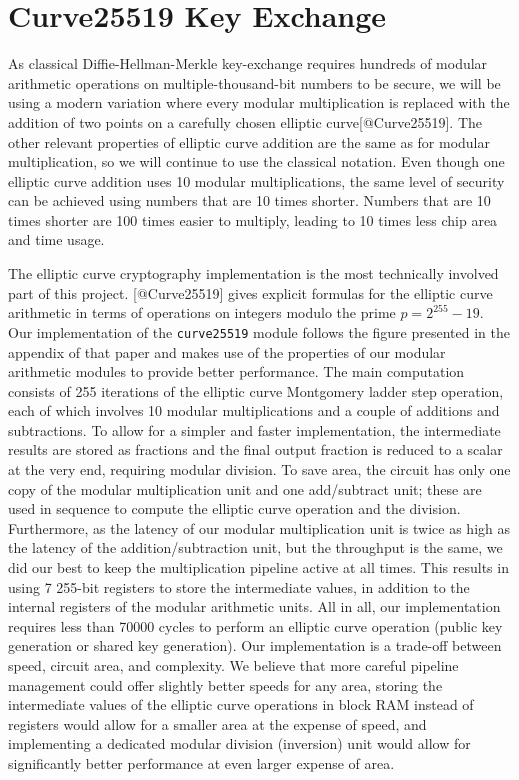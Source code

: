 \section{Curve25519 Key Exchange}\label{curve25519-key-exchange}

As classical Diffie-Hellman-Merkle key-exchange requires hundreds of
modular arithmetic operations on multiple-thousand-bit numbers to be
secure, we will be using a modern variation where every modular
multiplication is replaced with the addition of two points on a
carefully chosen elliptic curve{[}@Curve25519{]}. The other relevant
properties of elliptic curve addition are the same as for modular
multiplication, so we will continue to use the classical notation. Even
though one elliptic curve addition uses 10 modular multiplications, the
same level of security can be achieved using numbers that are 10 times
shorter. Numbers that are 10 times shorter are 100 times easier to
multiply, leading to 10 times less chip area and time usage.

The elliptic curve cryptography implementation is the most technically
involved part of this project. {[}@Curve25519{]} gives explicit formulas
for the elliptic curve arithmetic in terms of operations on integers
modulo the prime \(p=2^{255} -19\). Our implementation of the
\texttt{curve25519} module follows the figure presented in the appendix
of that paper and makes use of the properties of our modular arithmetic
modules to provide better performance. The main computation consists of
255 iterations of the elliptic curve Montgomery ladder step operation,
each of which involves 10 modular multiplications and a couple of
additions and subtractions. To allow for a simpler and faster
implementation, the intermediate results are stored as fractions and the
final output fraction is reduced to a scalar at the very end, requiring
modular division. To save area, the circuit has only one copy of the
modular multiplication unit and one add/subtract unit; these are used in
sequence to compute the elliptic curve operation and the division.
Furthermore, as the latency of our modular multiplication unit is twice
as high as the latency of the addition/subtraction unit, but the
throughput is the same, we did our best to keep the multiplication
pipeline active at all times. This results in using 7 255-bit registers
to store the intermediate values, in addition to the internal registers
of the modular arithmetic units. All in all, our implementation requires
less than 70000 cycles to perform an elliptic curve operation (public
key generation or shared key generation). Our implementation is a
trade-off between speed, circuit area, and complexity. We believe that
more careful pipeline management could offer slightly better speeds for
any area, storing the intermediate values of the elliptic curve
operations in block RAM instead of registers would allow for a smaller
area at the expense of speed, and implementing a dedicated modular
division (inversion) unit would allow for significantly better
performance at even larger expense of area.

